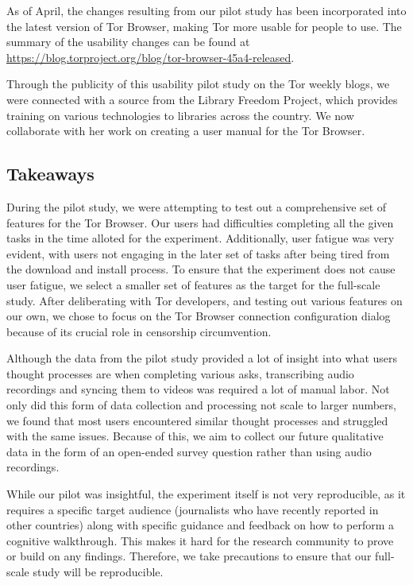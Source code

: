 \documentclass[letterpaper,twocolumn,11pt]{article}
\begin{document}
As of April, the changes resulting from our pilot study has been incorporated into the latest 
version of Tor Browser, making Tor more usable for people to use. 
The summary of the usability changes can be found at \url{https://blog.torproject.org/blog/tor-browser-45a4-released}. 

Through the publicity of this usability pilot study on the Tor weekly blogs, we were connected
with a source from the Library Freedom Project, which provides training on various technologies 
to libraries across the country. We now collaborate with her work on creating a user manual
for the Tor Browser. 

\subsection{Takeaways} 
\indent \indent During the pilot study, we were attempting to test out a comprehensive set of 
features for the Tor Browser. Our users had difficulties completing all the given tasks in the 
time alloted for the experiment. Additionally, user fatigue was very evident, with users not 
engaging in the later set of tasks after being tired from the download and install process. 
To ensure that the experiment does not cause user fatigue, we select a smaller set of features 
as the target for the full-scale study.  After deliberating with Tor developers, and testing out
various features on our own, we chose to focus on the Tor Browser connection configuration 
dialog because of its crucial role in censorship circumvention. 

Although the data from the pilot study provided a lot of insight into what users thought processes
are when completing various asks, transcribing audio recordings and syncing them to videos was
required a lot of manual labor. Not only did this form of data collection and processing not scale 
to larger numbers, we found that most users encountered similar thought processes and struggled
with the same issues. Because of this, we aim to collect our future qualitative data in the form of 
an open-ended survey question rather than using audio recordings. 

While our pilot was insightful, the experiment itself is not very reproducible, as it requires
a specific target audience (journalists who have recently reported in other countries) along 
with specific guidance and feedback on how to perform a cognitive walkthrough. This makes it hard
for the research community to prove or build on any findings. Therefore, we take precautions
to ensure that our full-scale study will be reproducible. 
\end{document}
